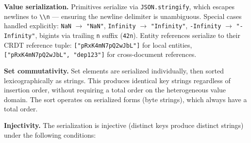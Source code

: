 \textbf{Value serialization.} Primitives serialize via \texttt{JSON.stringify}, which escapes newlines to \texttt{\textbackslash\textbackslash n} --- ensuring the newline delimiter is unambiguous. Special cases handled explicitly: \texttt{NaN} $\to$ \texttt{"NaN"}, \texttt{Infinity} $\to$ \texttt{"Infinity"}, \texttt{-Infinity} $\to$ \texttt{"-Infinity"}, bigints via trailing \texttt{n} suffix (\texttt{42n}). Entity references serialize to their CRDT reference tuple: \texttt{["pRxK4mN7pQ2wJbL"]} for local entities, \texttt{["pRxK4mN7pQ2wJbL", "dep123"]} for cross-document references.

\textbf{Set commutativity.} Set elements are serialized individually, then sorted lexicographically as strings. This produces identical key strings regardless of insertion order, without requiring a total order on the heterogeneous value domain. The sort operates on serialized forms (byte strings), which always have a total order.

\textbf{Injectivity.} The serialization is injective (distinct keys produce distinct strings) under the following conditions:

